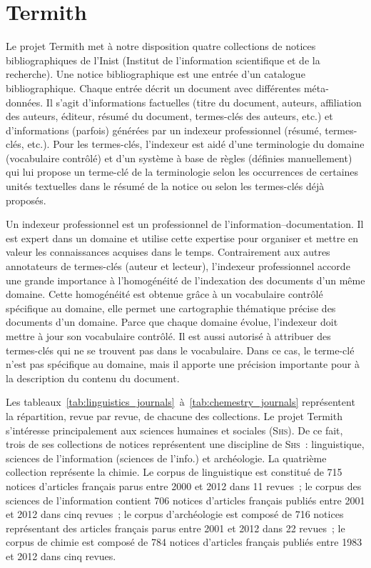   \section{Termith}
  \label{sec:main-data_description-termith_data}
    Le projet Termith met à notre disposition quatre collections de notices
    bibliographiques de l'Inist (Institut de l'information scientifique et de la
    recherche). Une notice bibliographique est une entrée d'un catalogue
    bibliographique. Chaque entrée décrit un document avec différentes
    méta-données. Il s'agit d'informations factuelles (titre du document,
    auteurs, affiliation des auteurs, éditeur, résumé du document, termes-clés
    des auteurs, etc.) et d'informations (parfois) générées par un indexeur
    professionnel (résumé, termes-clés, etc.). Pour les termes-clés, l'indexeur
    est aidé d'une terminologie du domaine (vocabulaire contrôlé) et d'un
    système à base de règles (définies manuellement) qui lui propose un
    terme-clé de la terminologie selon les occurrences de certaines unités
    textuelles dans le résumé de la notice ou selon les termes-clés déjà
    proposés.

    Un indexeur professionnel est un professionnel de
    l'information--documentation. Il est expert dans un domaine et utilise cette
    expertise pour organiser et mettre en valeur les connaissances acquises dans
    le temps. Contrairement aux autres annotateurs de termes-clés (auteur et
    lecteur), l'indexeur professionnel accorde une grande importance à
    l'homogénéité de l'indexation des documents d'un même domaine. Cette
    homogénéité est obtenue grâce à un vocabulaire contrôlé spécifique au
    domaine, elle permet une cartographie thématique précise des documents d'un
    domaine. Parce que chaque domaine évolue, l'indexeur  doit mettre à jour son
    vocabulaire contrôlé. Il est aussi autorisé à attribuer des termes-clés qui
    ne se trouvent pas dans le vocabulaire. Dans ce cas, le terme-clé n'est pas
    spécifique au domaine, mais il apporte une précision importante pour à la
    description du contenu du document. 
    
    Les tableaux~\ref{tab:linguistics_journals}~à~\ref{tab:chemestry_journals}
    représentent la répartition, revue par revue, de chacune des collections. Le
    projet Termith s'intéresse principalement aux sciences humaines et sociales
    (\textsc{Shs}). De ce fait, trois de ses collections de notices représentent
    une discipline de \textsc{Shs}~: linguistique, sciences de l'information
    (sciences de l'info.) et archéologie. La quatrième collection représente la
    chimie. Le corpus de linguistique est constitué de 715 notices d'articles
    français parus entre 2000 et 2012 dans 11 revues~; le corpus des sciences de
    l'information contient 706 notices d'articles français publiés entre 2001 et
    2012 dans cinq revues~; le corpus d'archéologie est composé de 716 notices
    représentant des articles français parus entre 2001 et 2012 dans 22 revues~;
    le corpus de chimie est composé de 784 notices d'articles français publiés
    entre 1983 et 2012 dans cinq revues.


